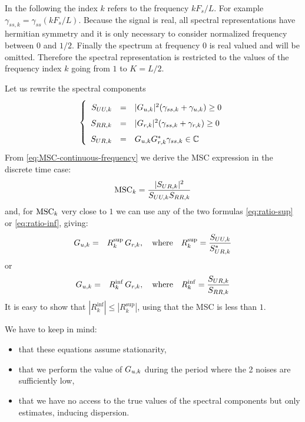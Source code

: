  In the following the index $k$ refers to the frequency $kF_{s}/L$. For example $\gamma_{ss,k}=\gamma_{ss}(kF_{s}/L)$. Because the signal is real, all spectral representations have hermitian symmetry and it is only necessary to consider normalized frequency between $0$ and $1/2$. Finally the spectrum at frequency 0 is real valued and will be omitted. Therefore the spectral representation is restricted to the values of the frequency index $k$ going from $1$ to $K=L/2$. 

Let us rewrite the spectral components
\begin{eqnarray}
\label{eq:spectral-model-dicrete}
\left\{
\renewcommand\arraystretch{1.6}
\begin{array}{rcl}
S_{UU,k}&=&|G_{\ut,k}|^{2} (\gamma_{ss,k}+\gamma_{\ut,k})\geq 0
\\
S_{RR,k}&=&|G_{\rf,k}|^{2} (\gamma_{ss,k}+\gamma_{\rf,k})\geq 0
\\
S_{UR,k}&=&G_{\ut,k}G^{*}_{\rf,k}\gamma_{ss,k}\in\mathbb{C}
\end{array}
\right.
\end{eqnarray}
From \eqref{eq:MSC-continuous-frequency} we derive the MSC expression in the discrete time case:
\begin{eqnarray}
 \label{eq:exact-MSC}
\mathrm{MSC}_{k} = \frac{|{S_{UR,k}}|^{2}}{{S_{UU,k}}{S_{RR,k}}}
\end{eqnarray}
and, for $\mathrm{MSC}_{k}$ very close to $1$ we can use any of the two formulas \eqref{eq:ratio-sup} or \eqref{eq:ratio-inf}, giving:
\begin{eqnarray}
\label{eq:ratio-sup-bis-exact}
{G_{{u},k}}&=&R_{k}^{\sup}\,G_{{r},k}, \quad \mathrm{where}\quad
R_{k}^{\sup} = \frac{{S_{UU,k}}}{{S^*_{UR,k}}}
\end{eqnarray}
or
\begin{eqnarray}
\label{eq:ratio-inf-bis-exact}
{G_{{u},k}}&=&R_{k}^{\inf}\,G_{{r},k}, \quad \mathrm{where}\quad
R_{k}^{\inf}=\frac{{S_{UR,k}}}{{S_{RR,k}}}
\end{eqnarray}
It is easy to show that $|R_{k}^{\inf}|\leq |R_{k}^{\sup}|$, using that the MSC is less than $1$.


We have to keep in mind:
\begin{itemize}
\item
that these equations assume stationarity,
\item
that we perform the value of $G_{{u},k}$ during the period where the 2 noises are sufficiently low,
\item
that we have no access to the true values of the spectral components but only estimates, inducing dispersion. 
\end{itemize}

